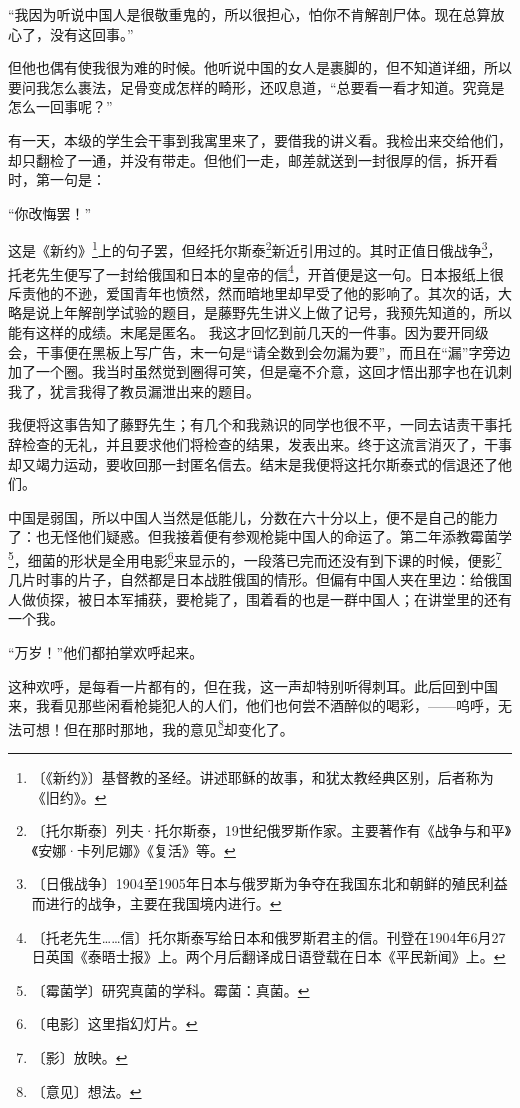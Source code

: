 \documentclass[12pt,UTF-8,openany]{ctexbook}
\begin{document}
\begin{large}
    “我因为听说中国人是很敬重鬼的，所以很担心，怕你不肯解剖尸体。现在总算放心了，没有这回事。”
    
    但他也偶有使我很为难的时候。他听说中国的女人是裹脚的，但不知道详细，所以要问我怎么裹法，足骨变成怎样的畸形，还叹息道，“总要看一看才知道。究竟是怎么一回事呢？”
    
    有一天，本级的学生会干事到我寓里来了，要借我的讲义看。我检出来交给他们，却只翻检了一通，并没有带走。但他们一走，邮差就送到一封很厚的信，拆开看时，第一句是：
    
    “你改悔罢！”
    
    这是《新约》\footnote{〔《新约》〕基督教的圣经。讲述耶稣的故事，和犹太教经典区别，后者称为《旧约》。}上的句子罢，但经托尔斯泰\footnote{〔托尔斯泰〕列夫·托尔斯泰，19世纪俄罗斯作家。主要著作有《战争与和平》《安娜·卡列尼娜》《复活》等。}新近引用过的。其时正值日俄战争\footnote{〔日俄战争〕1904至1905年日本与俄罗斯为争夺在我国东北和朝鲜的殖民利益而进行的战争，主要在我国境内进行。}，托老先生便写了一封给俄国和日本的皇帝的信\footnote{〔托老先生……信〕托尔斯泰写给日本和俄罗斯君主的信。刊登在1904年6月27日英国《泰晤士报》上。两个月后翻译成日语登载在日本《平民新闻》上。}，开首便是这一句。日本报纸上很斥责他的不逊，爱国青年也愤然，然而暗地里却早受了他的影响了。其次的话，大略是说上年解剖学试验的题目，是藤野先生讲义上做了记号，我预先知道的，所以能有这样的成绩。末尾是匿名。 我这才回忆到前几天的一件事。因为要开同级会，干事便在黑板上写广告，末一句是“请全数到会勿漏为要”，而且在“漏”字旁边加了一个圈。我当时虽然觉到圈得可笑，但是毫不介意，这回才悟出那字也在讥刺我了，犹言我得了教员漏泄出来的题目。
    
    我便将这事告知了藤野先生；有几个和我熟识的同学也很不平，一同去诘责干事托辞检查的无礼，并且要求他们将检查的结果，发表出来。终于这流言消灭了，干事却又竭力运动，要收回那一封匿名信去。结末是我便将这托尔斯泰式的信退还了他们。
    
    中国是弱国，所以中国人当然是低能儿，分数在六十分以上，便不是自己的能力了：也无怪他们疑惑。但我接着便有参观枪毙中国人的命运了。第二年添教霉菌学\footnote{〔霉菌学〕研究真菌的学科。霉菌：真菌。}，细菌的形状是全用电影\footnote{〔电影〕这里指幻灯片。}来显示的，一段落已完而还没有到下课的时候，便影\footnote{〔影〕放映。}几片时事的片子，自然都是日本战胜俄国的情形。但偏有中国人夹在里边：给俄国人做侦探，被日本军捕获，要枪毙了，围着看的也是一群中国人；在讲堂里的还有一个我。
    
    “万岁！”他们都拍掌欢呼起来。
    
    这种欢呼，是每看一片都有的，但在我，这一声却特别听得刺耳。此后回到中国来，我看见那些闲看枪毙犯人的人们，他们也何尝不酒醉似的喝彩，——呜呼，无法可想！但在那时那地，我的意见\footnote{〔意见〕想法。}却变化了。
    

\end{large}
\end{document}
